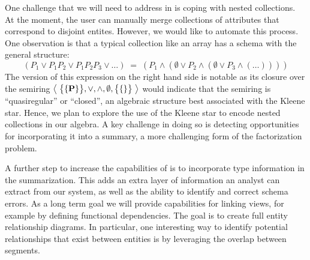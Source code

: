 

One challenge that we will need to address in \systemnametwo is coping with nested collections.  
At the moment, the user can manually merge collections of attributes that correspond to disjoint entites.
However, we would like to automate this process.
One observation is that a typical collection like an array has a schema with the general structure:
$$(P_1 \vee P_1P_2 \vee P_1P_2P_3 \vee \ldots)\;=\;(P_1 \wedge (\emptyset \vee P_2 \wedge (\emptyset \vee P_3 \wedge (\ldots)) ))$$
The version of this expression on the right hand side is notable as its closure over the semiring $\left<\;{\big\{\{\mathbf P\}\big\}, \vee, \wedge, \emptyset, \big\{\{\}\big\}}\;\right>$ would indicate that the semiring is ``quasiregular'' or ``closed'', an algebraic structure best associated with the Kleene star.
Hence, we plan to explore the use of the Kleene star to encode nested collections in our algebra.
A key challenge in doing so is detecting opportunities for incorporating it into a summary, a more challenging form of the factorization problem.

A further step to increase the capabilities of \systemnametwo is to incorporate type information in the summarization. 
This adds an extra layer of information an analyst can extract from our system, as well as the ability to identify and correct schema errors. 
As a long term goal we will provide capabilities for linking views, for example by defining functional dependencies.
The goal is to create full entity relationship diagrams. 
In particular, one interesting way to identify potential relationships that exist between entities is by leveraging the overlap between segments.